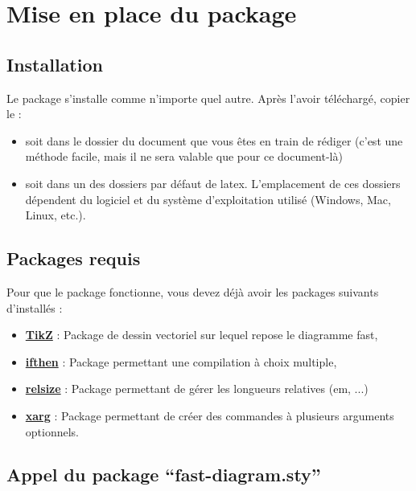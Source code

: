 \section{Mise en place du package}\label{MP}


	\subsection{Installation}\label{installation}

		Le package s'installe comme n'importe quel autre.
		Après l'avoir téléchargé, copier le :
		\begin{itemize}
			\item soit dans le dossier du document que vous êtes en train de rédiger (c'est une méthode facile, mais il ne sera valable que pour ce document-là)
			\item soit dans un des dossiers par défaut de latex.
				L'emplacement de ces dossiers dépendent du logiciel et du système d'exploitation utilisé (Windows, Mac, Linux, etc.).
		\end{itemize}

	\subsection{Packages requis}\label{packages}

		Pour que le package fonctionne, vous devez déjà avoir les packages suivants d'installés :
		\begin{itemize}
			\item \href{http://sourceforge.net/projects/pgf/}{\textbf{TikZ}} : Package de dessin vectoriel sur lequel repose le diagramme fast,
			\item \href{http://www.ctan.org/pkg/ifthen}{\textbf{ifthen}} : Package permettant une compilation à choix multiple,
			\item \href{http://www.ctan.org/pkg/relsize}{\textbf{relsize}} : Package permettant de gérer les longueurs relatives (em, ...)
			\item \href{http://tug.ctan.org/tex-archive/macros/latex/contrib/xargs}{\textbf{xarg}} : Package permettant de créer des commandes à plusieurs arguments optionnels.
		\end{itemize}

	\subsection{Appel du package ``fast-diagram.sty''}\label{appel}

